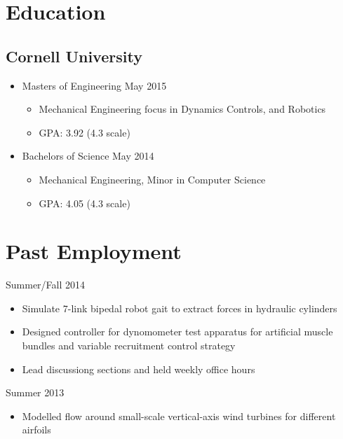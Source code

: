 \documentclass{BradyResume}
\begin{document}
\maketitle
\vspace*{-1em}
\section*{Education}
\subsection*{Cornell University}
\begin{itemize}
\item Masters of Engineering 
\hfill May 2015
  \begin{itemize}
      \item Mechanical Engineering focus in Dynamics Controls, and Robotics
      \item GPA: 3.92 (4.3 scale)
  \end{itemize}
\item Bachelors of Science 
\hfill May 2014
  \begin{itemize}
  \item Mechanical Engineering, Minor in Computer Science
  \item GPA: 4.05 (4.3 scale)
  \end{itemize}
\end{itemize}

\section*{Past Employment}
%
           {Summer/Fall 2014}
\begin{itemize}
  \item Simulate 7-link bipedal robot gait to extract forces in hydraulic cylinders
  \item Designed controller for dynomometer test apparatus for artificial muscle bundles and variable recruitment control strategy
\end{itemize}

\begin{itemize}
  \item Lead discussiong sections and held weekly office hours
\end{itemize}

%
           {Summer 2013}
\begin{itemize}
  \item Modelled flow around small-scale vertical-axis wind turbines for different airfoils
\end{itemize}
\end{document}

